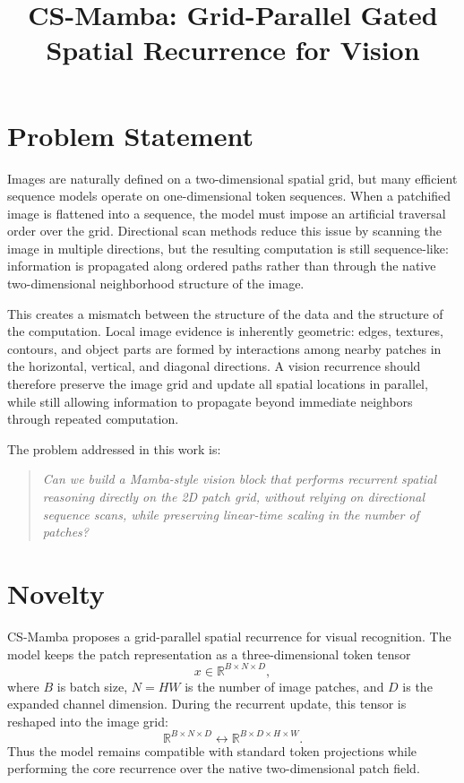 \documentclass[11pt]{article}
\title{CS-Mamba: Grid-Parallel Gated Spatial Recurrence for Vision}
\author{}
\date{}
\newcommand{\csm}{CS-Mamba}
\newcommand{\R}{\mathbb{R}}
\begin{document}
\maketitle

\section{Problem Statement}

Images are naturally defined on a two-dimensional spatial grid, but many efficient
sequence models operate on one-dimensional token sequences. When a patchified image
is flattened into a sequence, the model must impose an artificial traversal order
over the grid. Directional scan methods reduce this issue by scanning the image in
multiple directions, but the resulting computation is still sequence-like: information
is propagated along ordered paths rather than through the native two-dimensional
neighborhood structure of the image.

This creates a mismatch between the structure of the data and the structure of the
computation. Local image evidence is inherently geometric: edges, textures, contours,
and object parts are formed by interactions among nearby patches in the horizontal,
vertical, and diagonal directions. A vision recurrence should therefore preserve the
image grid and update all spatial locations in parallel, while still allowing
information to propagate beyond immediate neighbors through repeated computation.

The problem addressed in this work is:
\begin{quote}
\emph{Can we build a Mamba-style vision block that performs recurrent spatial
reasoning directly on the 2D patch grid, without relying on directional sequence
scans, while preserving linear-time scaling in the number of patches?}
\end{quote}

\section{Novelty}

\csm{} proposes a grid-parallel spatial recurrence for visual recognition. The
model keeps the patch representation as a three-dimensional token tensor
\[
    x \in \R^{B \times N \times D},
\]
where $B$ is batch size, $N=H W$ is the number of image patches, and $D$ is the
expanded channel dimension. During the recurrent update, this tensor is reshaped
into the image grid:
\[
    \R^{B \times N \times D}
    \longleftrightarrow
    \R^{B \times D \times H \times W}.
\]
Thus the model remains compatible with standard token projections while performing
the core recurrence over the native two-dimensional patch field.
\end{document}

